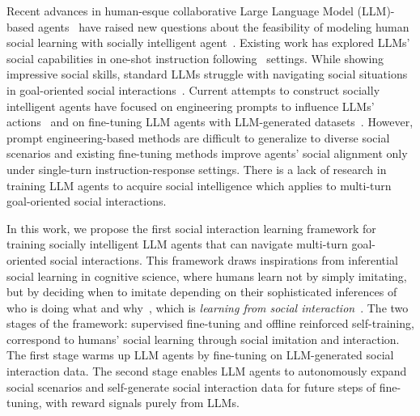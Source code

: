 Recent advances in human-esque collaborative Large Language Model (LLM)-based agents~\citep{zhang2023exploring} have raised new questions about the feasibility of modeling human social learning with socially intelligent agent~\citep{socially-intelligent-machines}. 
Existing work has explored LLMs' social capabilities in one-shot instruction following~\citep{sap2023neural, gandhi2023understanding, shapira2023clever} settings. While showing impressive social skills, standard LLMs struggle with navigating social situations in goal-oriented social interactions~\citep{sotopia}. 
Current attempts to construct socially intelligent agents have focused on engineering prompts to influence LLMs' actions~\citep{park2022socialsimulacra, fischer2023reflective} and on fine-tuning LLM agents with LLM-generated datasets~\citep{liu2023training}. 
However, prompt engineering-based methods are difficult to generalize to diverse social scenarios and existing fine-tuning methods improve agents' social alignment only under single-turn instruction-response settings. 
There is a lack of research in training LLM agents to acquire social intelligence which applies to multi-turn goal-oriented social interactions. 


In this work, we propose the first social interaction learning framework for training socially intelligent LLM agents that can navigate multi-turn goal-oriented social interactions. 
This framework draws inspirations from inferential social learning in cognitive science, where humans learn not by simply imitating, but by deciding when to imitate depending on their sophisticated inferences of who is doing what and why~\citep{inferential-social-learning}, which is \textit{learning from social interaction}~\citep{premack_woodruff_1978, Tomasello2021becoming}.
The two stages of the framework: supervised fine-tuning and offline reinforced self-training, correspond to humans' social learning through social imitation and interaction. 
The first stage warms up LLM agents by fine-tuning on LLM-generated social interaction data. 
The second stage enables LLM agents to autonomously expand social scenarios and self-generate social interaction data for future steps of fine-tuning, with reward signals purely from LLMs. 


